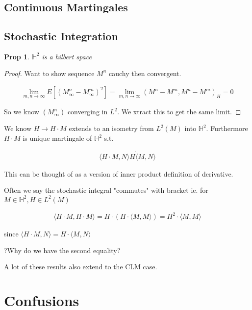 \documentclass[11pt]{article}
\newtheorem{prop}{Prop}
\begin{document}
\subsection{Continuous Martingales}



\subsection{Stochastic Integration}

\begin{prop}
	$\mathbb{H}^2$ is a hilbert space
\end{prop}

\begin{proof}
	Want to show sequence $M^n$ cauchy then convergent. 

	\begin{align*}
		\lim_{m,n \to \infty}E[(M_{\infty}^n-M_{\infty}^m)^2] = \lim_{m,n \to \infty}(M^n - M^m,M^n- M^m)_H = 0
	\end{align*}

	So we know $(M_{\infty}^n)$ converging in $L^2$. We xtract this to get the same limit. 
\end{proof}

We know $H \to H \cdot M$ extends to an isometry from $L^2(M)$ into $\mathbb{H}^2$. Furthermore $H \cdot M$ is unique martingale of $\mathbb{H}^2$ s.t.

\begin{align*}
	\langle H \cdot M, N \rangle H \dot \langle M ,N\rangle
\end{align*}

This can be thought of as a version of inner product definition of derivative.

Often we say the stochastic integral "commutes" with bracket ie. for $M \in \mathbb{H}^2, H \in L^2(M)$

\begin{align*}
	\langle H \cdot M,H \cdot M\rangle = H \cdot (H \cdot \langle M,M \rangle) = H^2 \cdot \langle M , M \rangle 
\end{align*}

since $\langle H \cdot M,N\rangle = H \cdot \langle M, N \rangle$

?Why do we have the second equality?

A lot of these results also extend to the CLM case.


\section{Confusions}
\end{document}
